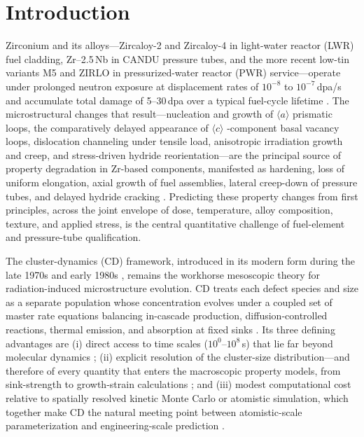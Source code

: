 \maketitle

\section{Introduction}\label{sec:introduction}

Zirconium and its alloys---Zircaloy-2 and Zircaloy-4 in light-water
reactor (LWR) fuel cladding, Zr--2.5\,Nb in CANDU pressure tubes, and
the more recent low-tin variants M5 and ZIRLO in pressurized-water
reactor (PWR) service---operate under prolonged neutron exposure at
displacement rates of $10^{-8}$ to $10^{-7}$\,dpa/s and accumulate
total damage of 5--30\,dpa over a typical fuel-cycle lifetime
\citep{Adamson2019,LemaignanMotta1994}. The microstructural changes
that result—nucleation and growth of $\langle a\rangle$ prismatic
loops, the comparatively delayed appearance of $\langle c\rangle$
-component basal vacancy loops, dislocation channeling under tensile
load, anisotropic irradiation growth and creep, and stress-driven
hydride reorientation—are the principal source of property
degradation in Zr-based components, manifested as hardening, loss of
uniform elongation, axial growth of fuel assemblies, lateral
creep-down of pressure tubes, and delayed hydride cracking
\citep{Northwood1977,Griffiths1988,OnimusBechade2012,Cinbiz2016}.
Predicting these property changes from first principles, across the
joint envelope of dose, temperature, alloy composition, texture, and
applied stress, is the central quantitative challenge of fuel-element
and pressure-tube qualification.

The cluster-dynamics (CD) framework, introduced in its modern form
during the late 1970s and early 1980s
\citep{Ghoniem1977,Ghoniem1979a,Ghoniem1980,Hayns1976,Kiritani1973},
remains the workhorse mesoscopic theory for radiation-induced
microstructure evolution. CD treats each defect species and size as a
separate population whose concentration evolves under a coupled set
of master rate equations balancing in-cascade production,
diffusion-controlled reactions, thermal emission, and absorption at
fixed sinks
\citep{BrailsfordBullough1972,Wiedersich1972,Mansur1978}. Its three
defining advantages are (i) direct access to time scales
($10^{0}$--$10^{8}$\,s) that lie far beyond molecular dynamics
\citep{Bacon2009,Marian2017}; (ii) explicit resolution of the
cluster-size distribution—and therefore of every quantity that
enters the macroscopic property models, from sink-strength to
growth-strain calculations
\citep{GolubovSingh2001,Holt1988}; and (iii) modest computational
cost relative to spatially resolved kinetic Monte Carlo or atomistic
simulation, which together make CD the natural meeting point between
atomistic-scale parameterization
\citep{Christensen2015,PatraTrinkle2019} and engineering-scale
prediction \citep{KohnertWirth2017,OnimusBechade2012}.

